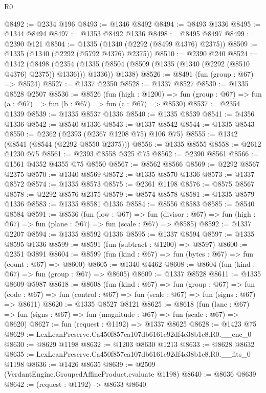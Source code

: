 \begin{lexlean}{R0}
\begin{coremodule}
@8492 := @2334 @196
@8493 := @1346 @8492
@8494 := @8493 @1336
@8495 := @1344 @8494
@8497 := @1353 @8492 @1336
@8498 := @8495 @8497
@8499 := @2390 @121
@8504 := @1335 (@1340 (@2292 (@8499 @4376) @2375))
@8509 := @1335 (@1340 (@2292 (@5792 @4376) @2375))
@8510 := @2390 @240
@8524 := @1342
    (@8498
      (@2354 (@1335 (@8504 (@8509 (@1335 (@1340 (@2292 (@8510 @4376) @2375)) @1336))) @1336))
      @1338)
@8526 := @8491 (fun (group : @67) => @8524)
@8527 := @1337 @2350
@8528 := @1337 @8527
@8530 := @1335 @8528 @2507
@8536 := @8526
    (fun (high : @1200) =>
    fun (group : @67) => fun (a : @67) => fun (b : @67) => fun (c : @67) => @8530)
@8537 := @2354 @1339
@8539 := @1335 @8537 @1336
@8540 := @1335 @8539
@8541 := @4356 @1336
@8542 := @8540 @1336
@8543 := @1337 @8542
@8544 := @1335 @8543
@8550 := @2362 (@2393 (@2367 @1208 @75) @106 @75)
@8555 := @1342 (@8541 (@8544 (@2292 @8550 @2375)))
@8556 := @1335 @8555
@8558 := @2612 @1230 @75
@8561 := @2393 @8558 @325 @75
@8562 := @2390 @8561
@8566 := @1561 @4352 @4355 @75 @8550
@8567 := @8562 @8566
@8569 := @2292 @8567 @2375
@8570 := @1340 @8569
@8572 := @1335 @8570 @1336
@8573 := @1337 @8572
@8574 := @1335 @8573
@8575 := @2361 @1198
@8576 := @8575 @8567
@8578 := @2292 @8576 @2375
@8579 := @8574 @8578
@8581 := @1335 @8579 @1336
@8583 := @1335 @8581 @1336
@8584 := @8556 @8583
@8585 := @8540 @8584
@8591 := @8536
    (fun (low : @67) =>
    fun (divisor : @67) => fun (high : @67) => fun (plane : @67) => fun (scale : @67) => @8585)
@8592 := @1337 @2207
@8594 := @1335 @8592 @1336
@8595 := @1337 @8594
@8597 := @1335 @8595 @1336
@8599 := @8591 (fun (subtract : @1200) => @8597)
@8600 := @2351 @3891
@8604 := @8599 (fun (kind : @67) => fun (bytes : @67) => fun (count : @67) => @8600)
@8605 := @1340 @4462
@8608 := @8604 (fun (kind : @67) => fun (group : @67) => @8605)
@8609 := @1337 @8528
@8611 := @1335 @8609 @5987
@8618 := @8608
    (fun (kind : @67) =>
    fun (group : @67) =>
    fun (code : @67) => fun (control : @67) => fun (scale : @67) => fun (signs : @67) => @8611)
@8620 := @1335 @8527 @8121
@8625 := @8618
    (fun (lane : @67) => fun (signs : @67) => fun (magnitude : @67) => fun (scale : @67) => @8620)
@8627 := fun (request : @1192) => @1337 @8625
@8628 := @1423 @75
@8629 := LexLeanPreserve.Ca450f857ca107db6161e92df4c38b1e8.R0.__enc_0
@8630 := @8629 @1198
@8632 := @1203 @8630 @1213
@8633 := @8628 @8632
@8635 := LexLeanPreserve.Ca450f857ca107db6161e92df4c38b1e8.R0.__fits_0 @1198
@8636 := @1426 @8635
@8639 := @2509 (VerdantEngine.GroupedAffineProduct.evaluate @1198)
@8640 := @8636 @8639
@8642 := (request : @1192) -> @8633 @8640

\end{coremodule}
\end{lexlean}
